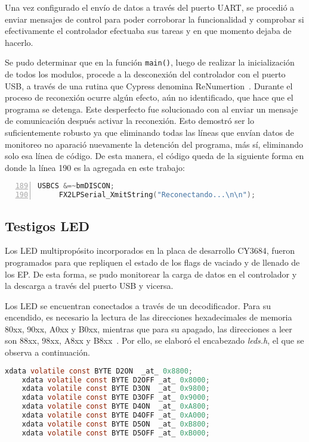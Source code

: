 Una vez configurado el envío de datos a través del puerto UART, se procedió a enviar mensajes de control para poder corroborar la funcionalidad y comprobar si efectivamente el controlador efectuaba sus tareas y en que momento dejaba de hacerlo.

Se pudo determinar que en la función \verb|main()|, luego de realizar la inicialización de todos los modulos, procede a la desconexión del controlador con el puerto USB, a través de una rutina que Cypress denomina ReNumertion~\cite{CypressSemiconductor2014fx2lp}. Durante el proceso de reconexión ocurre algún efecto, aún no identificado, que hace que el programa se detenga. Este desperfecto fue solucionado con al enviar un mensaje de comunicación después activar la reconexión. Esto demostró ser lo suficientemente robusto ya que eliminando todas las  líneas que envían datos de monitoreo no aparació nuevamente la detención del programa, más sí, eliminando solo esa línea de código. De esta manera, el código queda de la siguiente forma en donde la línea 190 es la agregada en este trabajo:

\begin{lstlisting}[language=C,backgroundcolor=\color{gray!30},numbers=left,firstnumber=189,basicstyle=\footnotesize]
	 USBCS &=~bmDISCON;
	 FX2LPSerial_XmitString("Reconectando...\n\n");
\end{lstlisting}

\subsection{Testigos LED}
Los LED multipropósito incorporados en la placa de desarrollo CY3684, fueron programados para que repliquen el estado de los flags de vaciado y de llenado de los EP. De esta forma, se pudo monitorear la carga de datos en el controlador y la descarga a través del puerto USB y vicersa.

Los LED se encuentran conectados a través de un decodificador. Para su encendido, es necesario la lectura de las direcciones hexadecimales de memoria 80xx, 90xx, A0xx y B0xx, mientras que para su apagado, las direcciones a leer son  88xx, 98xx, A8xx y B8xx~\cite{CypressSemiconductor2014cy3684}. Por ello, se elaboró el encabezado {\it leds.h}, el que se observa a continuación.
	
	\begin{lstlisting}[language=C,backgroundcolor=\color{gray!30}]
	xdata volatile const BYTE D2ON	_at_ 0x8800;
	xdata volatile const BYTE D2OFF	_at_ 0x8000;
	xdata volatile const BYTE D3ON	_at_ 0x9800;
	xdata volatile const BYTE D3OFF	_at_ 0x9000;
	xdata volatile const BYTE D4ON	_at_ 0xA800;
	xdata volatile const BYTE D4OFF	_at_ 0xA000;
	xdata volatile const BYTE D5ON	_at_ 0xB800;
	xdata volatile const BYTE D5OFF	_at_ 0xB000;	\end{lstlisting}
	
